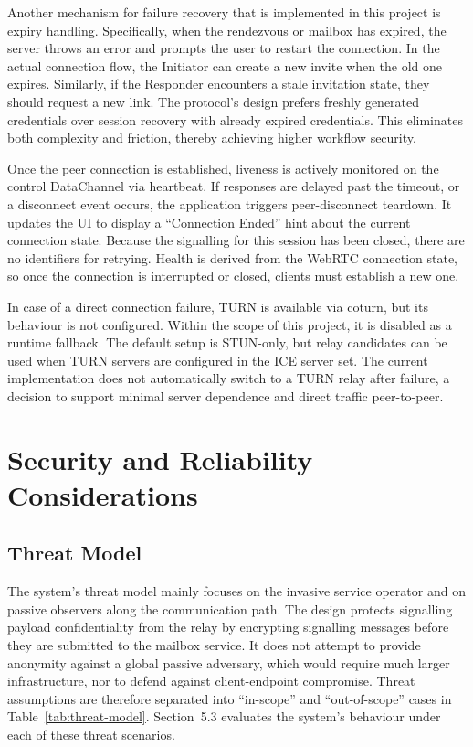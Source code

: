 \documentclass[12pt,a4paper,oneside]{report}
\begin{document}
Another mechanism for failure recovery that is implemented in this project is expiry handling. Specifically, when the rendezvous or mailbox has expired, the server throws an error and prompts the user to restart the connection. In the actual connection flow, the Initiator can create a new invite when the old one expires. Similarly, if the Responder encounters a stale invitation state, they should request a new link. The protocol's design prefers freshly generated credentials over session recovery with already expired credentials. This eliminates both complexity and friction, thereby achieving higher workflow security.

Once the peer connection is established, liveness is actively monitored on the control DataChannel via heartbeat. If responses are delayed past the timeout, or a disconnect event occurs, the application triggers peer-disconnect teardown. It updates the UI to display a ``Connection Ended'' hint about the current connection state. Because the signalling for this session has been closed, there are no identifiers for retrying. Health is derived from the WebRTC connection state, so once the connection is interrupted or closed, clients must establish a new one.

In case of a direct connection failure, TURN is available via coturn, but its behaviour is not configured. Within the scope of this project, it is disabled as a runtime fallback. The default setup is STUN-only, but relay candidates can be used when TURN servers are configured in the ICE server set. The current implementation does not automatically switch to a TURN relay after failure, a decision to support minimal server dependence and direct traffic peer-to-peer.


\section{Security and Reliability Considerations}
\label{sec:security-reliability}

\subsection{Threat Model}
\label{sec:threat-model}

The system's threat model mainly focuses on the invasive service operator and on passive observers along the communication path. The design protects signalling payload confidentiality from the relay by encrypting signalling messages before they are submitted to the mailbox service. It does not attempt to provide anonymity against a global passive adversary, which would require much larger infrastructure, nor to defend against client-endpoint compromise. Threat assumptions are therefore separated into ``in-scope'' and ``out-of-scope'' cases in Table~\ref{tab:threat-model}. Section~5.3 evaluates the system's behaviour under each of these threat scenarios.
\end{document}
